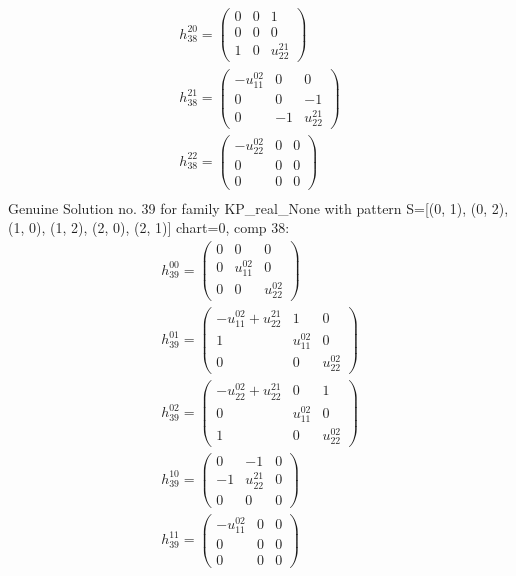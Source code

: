 \documentclass[a4paper, 11pt, twoside, onecolumn]{article}
\begin{document}
\begin{landscape}
\begin{gather*}
	 h_{38}^{20}=\begin{pmatrix}0 & 0 & 1\\0 & 0 & 0\\1 & 0 & u^{21}_{22}\end{pmatrix}\\ 
	 h_{38}^{21}=\begin{pmatrix}- u^{02}_{11} & 0 & 0\\0 & 0 & -1\\0 & -1 & u^{21}_{22}\end{pmatrix}\\ 
	 h_{38}^{22}=\begin{pmatrix}- u^{02}_{22} & 0 & 0\\0 & 0 & 0\\0 & 0 & 0\end{pmatrix}\\ 
\end{gather*} 
Genuine Solution no. 39 for family KP_real_None with pattern S=[(0, 1), (0, 2), (1, 0), (1, 2), (2, 0), (2, 1)] chart=0, comp 38: 
\begin{gather*} 
	 h_{39}^{00}=\begin{pmatrix}0 & 0 & 0\\0 & u^{02}_{11} & 0\\0 & 0 & u^{02}_{22}\end{pmatrix}\\ 
	 h_{39}^{01}=\begin{pmatrix}- u^{02}_{11} + u^{21}_{22} & 1 & 0\\1 & u^{02}_{11} & 0\\0 & 0 & u^{02}_{22}\end{pmatrix}\\ 
	 h_{39}^{02}=\begin{pmatrix}- u^{02}_{22} + u^{21}_{22} & 0 & 1\\0 & u^{02}_{11} & 0\\1 & 0 & u^{02}_{22}\end{pmatrix}\\ 
	 h_{39}^{10}=\begin{pmatrix}0 & -1 & 0\\-1 & u^{21}_{22} & 0\\0 & 0 & 0\end{pmatrix}\\ 
	 h_{39}^{11}=\begin{pmatrix}- u^{02}_{11} & 0 & 0\\0 & 0 & 0\\0 & 0 & 0\end{pmatrix}\\ 

\end{gather*}
\end{landscape}
\end{document}
